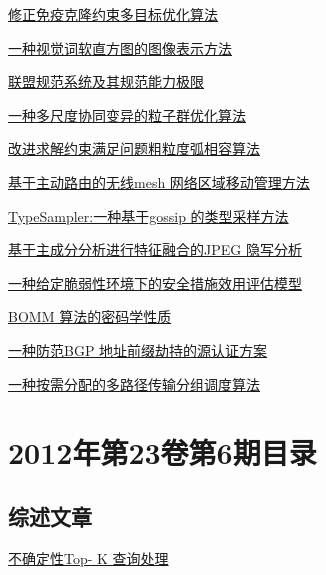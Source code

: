 \documentclass[a4paper]{article}
\begin{document}
\href{http://www.jos.org.cn/ch/reader/download_pdf.aspx?file_no=4108&year_id=2012&quarter_id=7&falg=1}{修正免疫克隆约束多目标优化算法}

\href{http://www.jos.org.cn/ch/reader/download_pdf.aspx?file_no=4082&year_id=2012&quarter_id=7&falg=1}{一种视觉词软直方图的图像表示方法}

\href{http://www.jos.org.cn/ch/reader/download_pdf.aspx?file_no=4135&year_id=2012&quarter_id=7&falg=1}{联盟规范系统及其规范能力极限}

\href{http://www.jos.org.cn/ch/reader/download_pdf.aspx?file_no=4128&year_id=2012&quarter_id=7&falg=1}{一种多尺度协同变异的粒子群优化算法}

\href{http://www.jos.org.cn/ch/reader/download_pdf.aspx?file_no=4129&year_id=2012&quarter_id=7&falg=1}{改进求解约束满足问题粗粒度弧相容算法}

\href{http://www.jos.org.cn/ch/reader/download_pdf.aspx?file_no=4093&year_id=2012&quarter_id=7&falg=1}{基于主动路由的无线mesh 网络区域移动管理方法}

\href{http://www.jos.org.cn/ch/reader/download_pdf.aspx?file_no=4097&year_id=2012&quarter_id=7&falg=1}{TypeSampler:一种基于gossip 的类型采样方法}

\href{http://www.jos.org.cn/ch/reader/download_pdf.aspx?file_no=4107&year_id=2012&quarter_id=7&falg=1}{基于主成分分析进行特征融合的JPEG 隐写分析}

\href{http://www.jos.org.cn/ch/reader/download_pdf.aspx?file_no=4112&year_id=2012&quarter_id=7&falg=1}{一种给定脆弱性环境下的安全措施效用评估模型}

\href{http://www.jos.org.cn/ch/reader/download_pdf.aspx?file_no=4123&year_id=2012&quarter_id=7&falg=1}{BOMM 算法的密码学性质}

\href{http://www.jos.org.cn/ch/reader/download_pdf.aspx?file_no=4125&year_id=2012&quarter_id=7&falg=1}{一种防范BGP 地址前缀劫持的源认证方案}

\href{http://www.jos.org.cn/ch/reader/download_pdf.aspx?file_no=4130&year_id=2012&quarter_id=7&falg=1}{一种按需分配的多路径传输分组调度算法}


\section{\textbf{2012年第23卷第6期目录}}
\subsection{综述文章}
\href{http://www.jos.org.cn/ch/reader/download_pdf.aspx?file_no=4200&year_id=2012&quarter_id=6&falg=1}{不确定性Top- K 查询处理}
\end{document}
